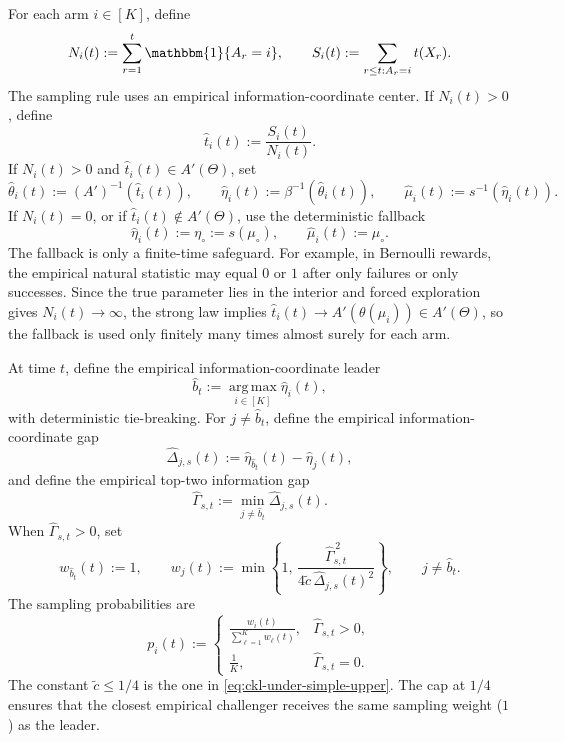 \documentclass[10pt]{article}
\theoremstyle{plain}
\begin{document}
For each arm \(i\in[K]\), define
\[
    N_i(t)
    :=
    \sum_{r=1}^{t}\mathbbm{1}\{A_r=i\},
    \qquad
    S_i(t)
    :=
    \sum_{r\le t:A_r=i}t(X_r).
\]
The sampling rule uses an empirical information-coordinate center.  If
\(N_i(t)>0\), define
\[
    \widehat{t}_i(t)
    :=
    \frac{S_i(t)}{N_i(t)} .
\]
If \(N_i(t)>0\) and
\(\widehat{t}_i(t)\in A'(\Theta)\), set
\begin{equation}
\label{eq:icpgws-empirical-center}
    \widehat\theta_i(t)
    :=
    (A')^{-1}\!\left(\widehat{t}_i(t)\right),
    \qquad
    \widehat\eta_i(t)
    :=
    \beta^{-1}\!\left(\widehat\theta_i(t)\right),
    \qquad
    \widehat\mu_i(t)
    :=
    s^{-1}\!\left(\widehat\eta_i(t)\right).
\end{equation}
If \(N_i(t)=0\), or if
\(\widehat{t}_i(t)\notin A'(\Theta)\), use the deterministic fallback
\begin{equation}
\label{eq:icpgws-empirical-center-fallback}
    \widehat\eta_i(t):=\eta_\circ:=s(\mu_\circ),
    \qquad
    \widehat\mu_i(t):=\mu_\circ .
\end{equation}
The fallback is only a finite-time safeguard.  For example, in Bernoulli rewards,
the empirical natural statistic may equal \(0\) or \(1\) after only failures
or only successes.  Since the true parameter lies in the interior and forced
exploration gives \(N_i(t)\to\infty\), the strong law implies
\(\widehat{t}_i(t)\to A'(\theta(\mu_i))\in A'(\Theta)\), so the fallback
is used only finitely many times almost surely for each arm.

At time \(t\), define the empirical information-coordinate leader
\begin{equation}
\label{eq:icpgws-leader}
    \widehat b_t
    :=
    \operatorname*{arg\,max}_{i\in[K]}\widehat\eta_i(t),
\end{equation}
with deterministic tie-breaking.  For \(j\neq\widehat b_t\), define the empirical
information-coordinate gap
\[
    \widehat\Delta_{j,s}(t)
    :=
    \widehat\eta_{\widehat b_t}(t)-\widehat\eta_j(t),
\]
and define the empirical top-two information gap
\[
    \widehat\Gamma_{s,t}
    :=
    \min_{j\neq\widehat b_t}\widehat\Delta_{j,s}(t).
\]
When \(\widehat\Gamma_{s,t}>0\), set
\begin{equation}
\label{eq:icpgws-weights}
    w_{\widehat b_t}(t):=1,
    \qquad
    w_j(t)
    :=
    \min\left\{
        1,\,
        \frac{\widehat\Gamma_{s,t}^{\,2}}
        {4\widetilde c\,\widehat\Delta_{j,s}(t)^2}
    \right\},
    \qquad j\neq\widehat b_t .
\end{equation}
The sampling probabilities are
\begin{equation}
\label{eq:icpgws-sampling-prob}
    p_i(t)
    :=
    \begin{cases}
    \displaystyle
    \frac{w_i(t)}{\sum_{\ell=1}^K w_\ell(t)},
    & \widehat\Gamma_{s,t}>0,\\[10pt]
    \displaystyle
    \frac1K,
    & \widehat\Gamma_{s,t}=0 .
    \end{cases}
\end{equation}
The constant \(\widetilde c\le 1/4\) is the one in
\eqref{eq:ckl-under-simple-upper}.  The cap at \(1/4\) ensures that the closest empirical challenger receives the same sampling weight ($1$) as the leader.
\end{document}
